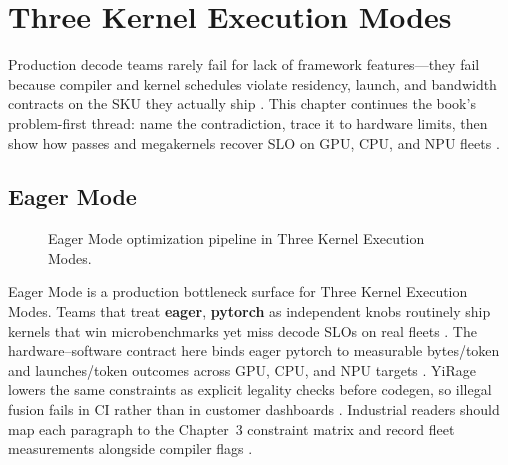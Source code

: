 \chapter{Three Kernel Execution Modes}
\label{chap:ch12}

Production decode teams rarely fail for lack of framework features---they fail because compiler and kernel schedules violate residency, launch, and bandwidth contracts on the SKU they actually ship \citep{patel2025llminference,nvidia2022hopper}. This chapter continues the book's problem-first thread: name the contradiction, trace it to hardware limits, then show how passes and megakernels recover SLO on GPU, CPU, and NPU fleets \citep{taxbreak2026,semianalysis2024tma}.

\section{Eager Mode}
\label{sec:eager_mode}
\begin{figure}[t]
\centering
{}
\caption{Eager Mode optimization pipeline in Three Kernel Execution Modes.}
\label{fig:eager_mode_pipeline}
\end{figure}


Eager Mode is a production bottleneck surface for Three Kernel Execution Modes. Teams that treat \textbf{eager}, \textbf{pytorch} as independent knobs routinely ship kernels that win microbenchmarks yet miss decode SLOs on real fleets \citep{patel2025llminference,nvidia2022hopper}. The hardware--software contract here binds eager pytorch to measurable bytes/token and launches/token outcomes across GPU, CPU, and NPU targets \citep{taxbreak2026,semianalysis2024tma}. YiRage lowers the same constraints as explicit legality checks before codegen, so illegal fusion fails in CI rather than in customer dashboards \citep{memoryfloor2026,amd2024xdna}. Industrial readers should map each paragraph to the Chapter~3 constraint matrix and record fleet measurements alongside compiler flags \citep{nvidia2022hopper,amd2024aie}.

